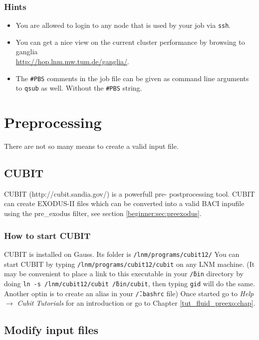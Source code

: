 \subsubsection{Hints}

\begin{itemize}
\item You are allowed to login to any node that is used by your job via
\texttt{ssh}.
\item You can get a nice view on the current cluster performance by browsing
to ganglia\\
\url{http://hop.lnm.mw.tum.de/ganglia/}.
\item The \texttt{\#PBS} comments in the job file can be given as command
line arguments to \texttt{qsub} as well. Without the \texttt{\#PBS}
string.
\end{itemize}

\section{Preprocessing}

There are not so many means to create a valid input file.


\subsection{CUBIT}\label{beginner:sec:cubit}
CUBIT (http://cubit.sandia.gov/) is a powerfull  pre- postprocessing tool. CUBIT can create EXODUS-II files
which can be converted into a valid BACI inpufile using the pre\_exodus filter, see section \ref{beginner:sec:preexodus}.

\subsubsection{How to start CUBIT}
CUBIT is installed on Gauss. Its folder is \texttt{/lnm/programs/cubit12/}
You can start CUBIT by typing  \texttt{/lnm/programs/cubit12/cubit} on any LNM machine.
(It may be convenient to place a link to this executable in your \texttt{\~{/}bin}
directory by doing \texttt{ln -s /lnm/cubit12/cubit \~{/}bin/cubit}, then
typing \texttt{gid} will do the same. Another optin is to create an alias in your \texttt{\~{/}.bashrc} file)
Once started go to \textit{Help} $\rightarrow$ \textit{Cubit Tutorials} for an introduction or go to Chapter
\ref{tut_fluid_preexo:chap}.


\subsection{Modify \ccarat{} input files}

